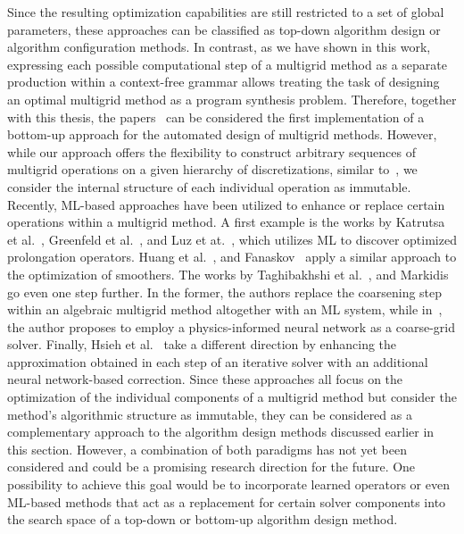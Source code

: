 Since the resulting optimization capabilities are still restricted to a set of global parameters, these approaches can be classified as top-down algorithm design or algorithm configuration methods.
In contrast, as we have shown in this work, expressing each possible computational step of a multigrid method as a separate production within a context-free grammar allows treating the task of designing an optimal multigrid method as a program synthesis problem.
Therefore, together with this thesis, the papers~\cite{schmitt2020constructing,schmitt2021evostencils,schmitt2022evolving} can be considered the first implementation of a bottom-up approach for the automated design of multigrid methods.
However, while our approach offers the flexibility to construct arbitrary sequences of multigrid operations on a given hierarchy of discretizations, similar to~\cite{oosterlee2003genetic,thekale2010optimizing,brown2021tuning}, we consider the internal structure of each individual operation as immutable.
Recently, ML-based approaches have been utilized to enhance or replace certain operations within a multigrid method.
A first example is the works by Katrutsa et al.~\cite{katrutsa2020black}, Greenfeld et al.~\cite{greenfeld2019learning}, and Luz et at.~\cite{luz2020learning}, which utilizes ML to discover optimized prolongation operators.
Huang et al.~\cite{huang2021learning}, and Fanaskov~\cite{fanaskov2021neural} apply a similar approach to the optimization of smoothers.
The works by Taghibakhshi et al.~\cite{taghibakhshi2021optimization}, and Markidis~\cite{markidis2021old} go even one step further.
In the former, the authors replace the coarsening step within an algebraic multigrid method altogether with an ML system, while in~\cite{markidis2021old}, the author proposes to employ a physics-informed neural network as a coarse-grid solver.
Finally, Hsieh et al.~\cite{hsieh2019learning} take a different direction by enhancing the approximation obtained in each step of an iterative solver with an additional neural network-based correction.
Since these approaches all focus on the optimization of the individual components of a multigrid method but consider the method's algorithmic structure as immutable, they can be considered as a complementary approach to the algorithm design methods discussed earlier in this section.
However, a combination of both paradigms has not yet been considered and could be a promising research direction for the future.
One possibility to achieve this goal would be to incorporate learned operators or even ML-based methods that act as a replacement for certain solver components into the search space of a top-down or bottom-up algorithm design method.
